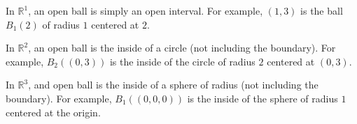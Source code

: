 \documentclass{ximera}
\begin{document}
\begin{example}
In $\mathbb{R}^1$, an open ball is simply an open interval. For example, $(1,3)$ is the ball $B_1(2)$ of radius $1$ centered at $2$.




In $\mathbb{R}^2$, an open ball is the inside of a circle (not including the boundary). For example, $B_2((0,3))$ is the inside of the circle of radius $2$ centered at $(0,3)$.

%
%


In $\mathbb{R}^3$, and open ball is the inside of a sphere of radius (not including the boundary). For example, $B_1((0,0,0))$ is the inside of the sphere of radius $1$ centered at the origin.

%  


\end{example}
\end{document}
